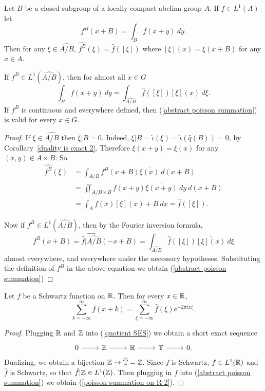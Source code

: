 \begin{theorem}
Let $B$ be a closed subgroup of a locally compact abelian group $A$.
If $f \in L^1(A)$ let
\[f^B(x + B) = \int_{B} f(x + y)~dy.\]
Then for any $\xi \in \widehat{A/B}$, $\widehat{f^B}(\xi) = \hat f([\xi])$
where $[\xi](x) = \xi(x + B)$ for any $x \in A$.

If $f^{B} \in L^1(\widehat{A/B})$, then for almost all $x \in G$
\begin{equation}\label{abstract poisson summation}
\int_{B} f(x + y)~dy = \int_{\widehat{A/B}} \hat f([\xi]) [\xi](x) ~d\xi.
\end{equation}
If $f^B$ is continuous and everywhere defined, then (\ref{abstract poisson summation}) is valid for every $x \in G$.
\end{theorem}
\begin{proof}
If $\xi \in \widehat{A/B}$ then $\xi|B = 0$. Indeed, $\xi|B = \hat \iota(\xi) = \hat \iota(\hat q(B)) = 0$, by Corollary~\ref{duality is exact 2}.
Therefore $\xi(x + y) = \xi(x)$ for any $(x, y) \in A \times B$.
So
\begin{align*}\widehat{f^B}(\xi) &= \int_{A/B} f^B(x + B) \overline{\xi(x)}~d(x + B)\\& = \iint_{A/B \times B} f(x + y) \overline{\xi(x + y)}~dy~d(x+B) \\&= \int_{A} f(x)\overline{[\xi](x) + B}~dx = \hat f([\xi]).\end{align*}

Now if $f^{B} \in L^1(\widehat{A/B})$, then by the Fourier inversion formula,
\[f^B(x + B) = \widehat{\hat f|\widehat{A/B}}(-x + B) = \int_{\widehat{A/B}} \hat f([\xi]) \overline{[\xi](x)}~d\xi\]
almost everywhere, and everywhere under the necessary hypotheses.
Substituting the definition of $f^B$ in the above equation we obtain (\ref{abstract poisson summation})
\end{proof}

\begin{corollary}\label{poisson summation on R}
Let $f$ be a Schwartz function on $\mathbb{R}$. Then for every $x \in \mathbb{R}$,
\begin{equation}\label{poisson summation on R 2}
\sum_{k=-\infty}^{\infty} f(x + k) = \sum_{\xi = -\infty}^{\infty} \hat f(\xi) e^{-2\pi ix\xi}.
\end{equation}
\end{corollary}
\begin{proof}
Plugging $\mathbb{R}$ and $\mathbb{Z}$ into (\ref{quotient SES}) we obtain a short exact sequence
$$\begin{tikzcd}
0 \arrow[r] & \ZZ \arrow[r] & \RR \arrow[r] & \Torus \arrow[r] & 0.
\end{tikzcd}$$
Dualizing, we obtain a bijection $\mathbb{Z} \to \widehat{\mathbb{T}} = \mathbb{Z}$.
Since $f$ is Schwartz, $f \in L^1(\mathbb{R})$ and $\hat f$ is Schwartz, so that $\hat f|\mathbb{Z} \in L^1(\mathbb{Z})$.
Then plugging in $f$ into (\ref{abstract poisson summation}) we obtain (\ref{poisson summation on R 2}).
\end{proof}

